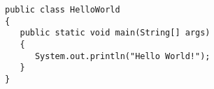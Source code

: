 \lstset{language=Java}
\begin{lstlisting}
public class HelloWorld 
{ 
   public static void main(String[] args)
   {
      System.out.println("Hello World!");
   } 
}
\end{lstlisting}
